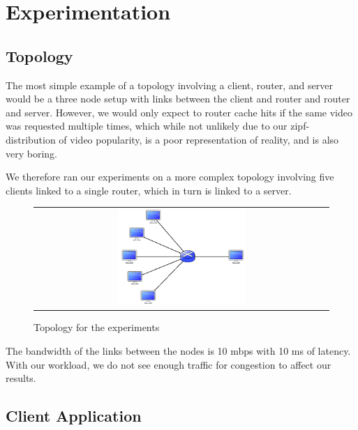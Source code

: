 \section{Experimentation} \label{sec:experimentation}

\subsection{Topology} \label{sec:topology}

The most simple example of a topology involving a client, router, and server
would be a three node setup with links between the client and router and router
and server. However, we would only expect to router cache hits if the same video
was requested multiple times, which while not unlikely due to our
zipf-distribution of video popularity, is a poor representation of reality, and
is also very boring.

We therefore ran our experiments on a more complex topology involving five
clients linked to a single router, which in turn is linked to a server.

\begin{figure}[h]
    \begin{center}
        \begin{tabular}{c}
            \includegraphics[width=0.45\textwidth]{fig/topology.png} \\
        \end{tabular}
        \caption{Topology for the experiments}
        \label{fig:topology}
    \end{center}
\end{figure}

The bandwidth of the links between the nodes is 10  mbps with
10 ms of latency. With our workload, we do not  see enough traffic for
congestion to affect our results.



\subsection{Client Application} \label{sec:client}

